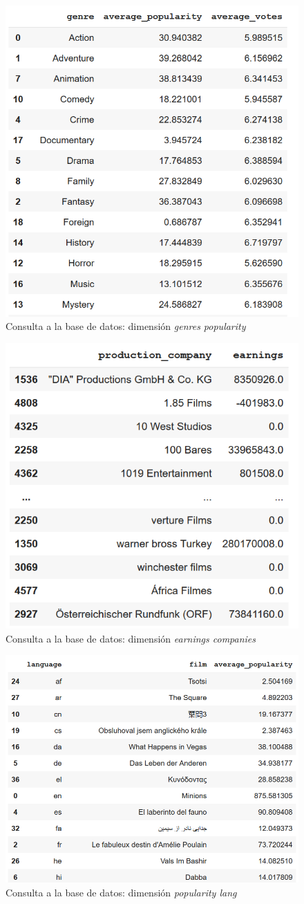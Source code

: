 \documentclass[11pt,a4paper]{article}
\begin{document}
	\begin{figure}
		\centering
		\includegraphics[width=0.6\linewidth]{./images/query3.png} 
		\caption{Consulta a la base de datos: dimensión \textit{genres popularity}}
		\label{fig:query3}
	\end{figure}

	\begin{figure}
		\centering
		\includegraphics[width=0.6\linewidth]{./images/query4.png} 
		\caption{Consulta a la base de datos: dimensión \textit{earnings companies}}
		\label{fig:query4}
	\end{figure}
		
	\begin{figure}
		\centering
		\includegraphics[width=0.6\linewidth]{./images/query5.png} 
		\caption{Consulta a la base de datos: dimensión \textit{popularity lang}}
		\label{fig:query5}
	\end{figure}
	
\end{document}
